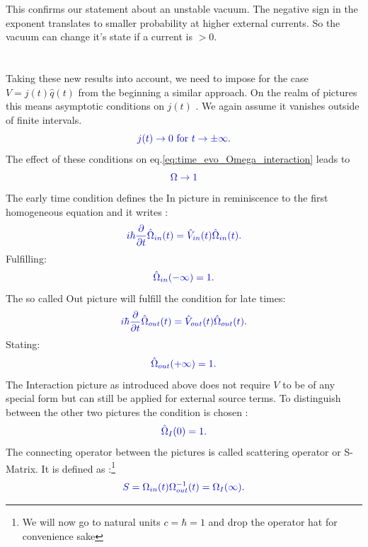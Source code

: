 \documentclass[12pt, titlepage]{article}
\begin{document}
This confirms our statement about an unstable vacuum. The negative sign in the exponent translates to smaller probability at higher external currents. So the vacuum can change it's state if a current is $ >0 $.
\\\\
%
%
%
%
%
%
\\
Taking these new results into account, we need to impose for the case $  V=j(t)\hat{q}(t) $ from the beginning a similar approach. On the realm of pictures this means asymptotic conditions on $ j(t) $ . We  again assume it vanishes outside of finite intervals. 
\begin{equation}
\textcolor[RGB]{0,0,204}{
j(t)\rightarrow 0 \text{ for } t\rightarrow \pm \infty
}. 
\end{equation}
The effect of these conditions on eq.\eqref{eq:time_evo_Omega_interaction} leads to 
\begin{equation}
\textcolor[RGB]{0,0,204}{
\Omega \rightarrow 1
}
\end{equation}
The early time condition defines the In picture in reminiscence to the first homogeneous equation and it  writes :
\begin{equation}\label{eq:time_evo_Omega_in}
\textcolor[RGB]{0,0,204}{
	i\hbar
	\frac{\partial}{\partial t}
	\hat{\Omega}_{in}(t)
	=
	\hat{V}_{in}(t)
	\hat{\Omega}_{in}(t)
	.}
\end{equation}
Fulfilling:
\begin{equation}\label{eq:Omega_in_cond}
\textcolor[RGB]{0,0,204}{
	\hat{\Omega}_{in}(-\infty)
	=1
	.}
\end{equation}
The so called Out picture will fulfill the condition for late times:
\begin{equation}\label{eq:time_evo_Omega_out}
\textcolor[RGB]{0,0,204}{
	i\hbar
	\frac{\partial}{\partial t}
	\hat{\Omega}_{out}(t)
	=
	\hat{V}_{out}(t)
	\hat{\Omega}_{out}(t)
	.}
\end{equation}
Stating:
\begin{equation}\label{eq:Omega_out_cond}
\textcolor[RGB]{0,0,204}{
	\hat{\Omega}_{out}(+\infty)
	=1
	.}
\end{equation}
The Interaction picture as introduced above does not require $ V $ to be of any special form but can still be applied for external source terms. To distinguish between the other two pictures the condition is chosen :
\begin{equation}\label{eq:Omega_I_cond}
\textcolor[RGB]{0,0,204}{
	\hat{\Omega}_{I}(0)
	=1
	.}
\end{equation}
The connecting operator between the pictures is called scattering operator or S-Matrix. It is defined as :\footnote{We will now go to natural units $c= \hbar=1 $ and drop the operator hat for convenience sake}
\begin{equation}\label{eq:S_in_out}
\textcolor[RGB]{0,0,204}{
	S=\Omega_{in}(t)\Omega_{out}^{-1}(t)
	=\Omega_{I}(\infty)
	.}
\end{equation}
\end{document}
